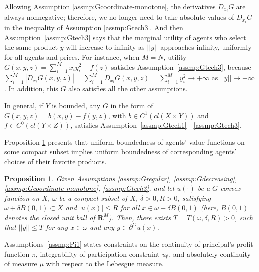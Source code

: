 \documentclass[a4paper, 11pt]{amsart}
\numberwithin{equation}{section}
\theoremstyle{plain}
\newtheorem{proposition}[theorem]{Proposition}
\theoremstyle{definition}
\theoremstyle{remark}
\newcommand{\R}{\mathbf{R}}
\begin{document}
{Allowing Assumption \ref{assmp:Gcoordinate-monotone}, {the derivatives $D_{x_i}G$ are always nonnegative; therefore,} we no longer need to take absolute values of $D_{x_i}G$ in the inequality of Assumption \ref{assmp:Gtech3}.} And then Assumption~\ref{assmp:Gtech3} says that the marginal utility of agents who select the same product $y$ will increase to infinity as $||y||$ approaches infinity, uniformly for all agents and prices. {For instance, when $M = N$, utility $G(x,y,z) = \sum_{i=1}^{M} x_iy_i^2 -f(z) $ satisfies Assumption~\ref{assmp:Gtech3}, because $\sum_{i=1}^{M} |D_{x_i}G(x,y,z)| = \sum_{i=1}^{M} D_{x_i}G(x,y,z) = \sum_{i=1}^{M} y_i^2 \longrightarrow +\infty$ as $||y|| \longrightarrow + \infty$. In addition, this $G$ also satisfies all the other assumptions.}\medskip


In general, if $Y$ is bounded, any $G$ in the form of $G(x,y,z) = b(x,y) - f(y,z)$, with $b \in C^1(cl(X\times Y))$ and $f\in C^0(cl(Y \times Z))$, satisfies Assumption~\ref{assmp:Gtech1} - \ref{assmp:Gtech3}.\medskip


Proposition \ref{Subdiff/Bdd} presents that uniform boundedness of agents' value functions on some compact subset implies uniform boundedness of corresponding agents' choices of their favorite products. \medskip

\begin{proposition}\label{Subdiff/Bdd}
	Given Assumptions \ref{assmp:Gregular}, \ref{assmp:Gdecreasing}, \ref{assmp:Gcoordinate-monotone}, \ref{assmp:Gtech3}, and let $u(\cdot)$ be a $G$-convex function on $X$, $\omega$ be a compact subset of $X$, $\delta>0, R>0$, satisfying $\omega+\delta\overline{B(0,1)}\subset X$ and $|u(x)|\le R$ for all $x\in \omega + \delta \overline{B(0,1)}$ (here, $\overline{B(0,1)}$ denotes the closed unit ball of $\R^M$). Then, there exists $T = T(\omega,\delta, R) > 0$, such that $||y||\le T$ for any $x \in \omega$ and any $y\in \partial^Gu(x)$.
\end{proposition}




Assumptions~\ref{assmp:Pi1} states constraints on the continuity of principal's profit function $\pi$, integrability of participation constraint $u_{\emptyset}$, and absolutely continuity of measure $\mu$ with respect to the Lebesgue measure. 

\end{document}
